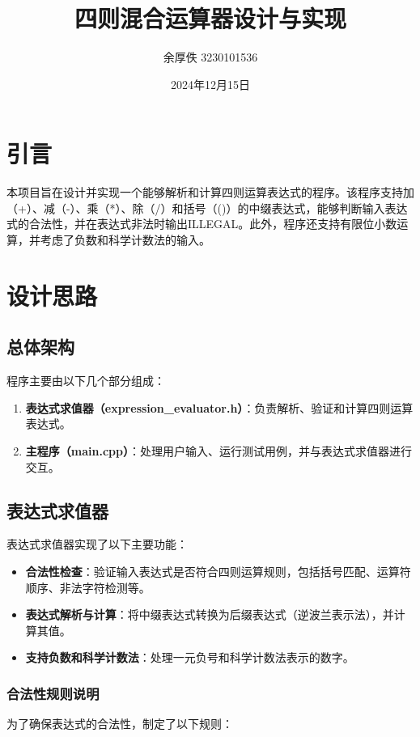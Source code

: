 \documentclass{article}
\title{四则混合运算器设计与实现}
\author{余厚佚 3230101536}
\date{2024年12月15日}
\begin{document}
    \maketitle

    \section{引言}
    本项目旨在设计并实现一个能够解析和计算四则运算表达式的程序。该程序支持加（+）、减（-）、乘（*）、除（/）和括号（()）的中缀表达式，能够判断输入表达式的合法性，并在表达式非法时输出ILLEGAL。此外，程序还支持有限位小数运算，并考虑了负数和科学计数法的输入。

    \section{设计思路}
    \subsection{总体架构}
    程序主要由以下几个部分组成：
    \begin{enumerate}
        \item \textbf{表达式求值器（expression\_evaluator.h）}：负责解析、验证和计算四则运算表达式。
        \item \textbf{主程序（main.cpp）}：处理用户输入、运行测试用例，并与表达式求值器进行交互。
    \end{enumerate}



    \subsection{表达式求值器}
    表达式求值器实现了以下主要功能：
    \begin{itemize}
        \item \textbf{合法性检查}：验证输入表达式是否符合四则运算规则，包括括号匹配、运算符顺序、非法字符检测等。
        \item \textbf{表达式解析与计算}：将中缀表达式转换为后缀表达式（逆波兰表示法），并计算其值。
        \item \textbf{支持负数和科学计数法}：处理一元负号和科学计数法表示的数字。
    \end{itemize}


\subsubsection{合法性规则说明}
为了确保表达式的合法性，制定了以下规则：
\end{document}
